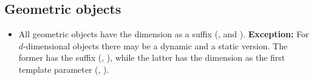 \subsection*{Geometric objects}

\begin{itemize}
\item All geometric objects have the dimension as a suffix (\eg, 
      and ).
     \textbf{Exception:} For $d$-dimensional objects there may be a dynamic
     and a static version. The former has the suffix 
     (\eg, ), while the latter has the dimension as the first
     template parameter (\eg, ).
\end{itemize}

